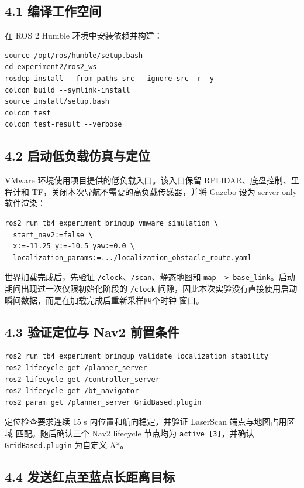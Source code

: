 \documentclass[12pt,a4paper]{ctexart}
\begin{document}
\subsection*{4.1 编译工作空间}

在 ROS 2 Humble 环境中安装依赖并构建：
\begin{verbatim}
source /opt/ros/humble/setup.bash
cd experiment2/ros2_ws
rosdep install --from-paths src --ignore-src -r -y
colcon build --symlink-install
source install/setup.bash
colcon test
colcon test-result --verbose
\end{verbatim}

\subsection*{4.2 启动低负载仿真与定位}

VMware 环境使用项目提供的低负载入口。该入口保留 RPLIDAR、底盘控制、里程计和
TF，关闭本次导航不需要的高负载传感器，并将 Gazebo 设为 server-only 软件渲染：
\begin{verbatim}
ros2 run tb4_experiment_bringup vmware_simulation \
  start_nav2:=false \
  x:=-11.25 y:=-10.5 yaw:=0.0 \
  localization_params:=.../localization_obstacle_route.yaml
\end{verbatim}

世界加载完成后，先验证 \texttt{/clock}、\texttt{/scan}、静态地图和
\texttt{map -> base\_link}。启动期间出现过一次仅限初始化阶段的 \texttt{/clock}
间隙，因此本次实验没有直接使用启动瞬间数据，而是在加载完成后重新采样四个时钟
窗口。

\subsection*{4.3 验证定位与 Nav2 前置条件}

\begin{verbatim}
ros2 run tb4_experiment_bringup validate_localization_stability
ros2 lifecycle get /planner_server
ros2 lifecycle get /controller_server
ros2 lifecycle get /bt_navigator
ros2 param get /planner_server GridBased.plugin
\end{verbatim}

定位检查要求连续 15 s 内位置和航向稳定，并验证 LaserScan 端点与地图占用区域
匹配。随后确认三个 Nav2 lifecycle 节点均为 \texttt{active [3]}，并确认
\texttt{GridBased.plugin} 为自定义 A*。

\subsection*{4.4 发送红点至蓝点长距离目标}
\end{document}
